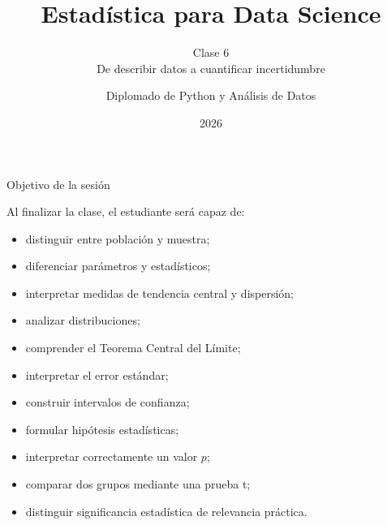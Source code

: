 \documentclass[aspectratio=169,11pt]{beamer}
\title{Estadística para Data Science}
\subtitle{
Clase 6\\
De describir datos a cuantificar incertidumbre
}
\author{
Diplomado de Python y Análisis de Datos
}
\institute{
Universidad Marista
}
\date{2026}
\begin{document}

\begin{frame}
    \titlepage
\end{frame}


\begin{frame}{Objetivo de la sesión}

Al finalizar la clase, el estudiante será capaz de:

\begin{itemize}

    \item distinguir entre población y muestra;

    \item diferenciar parámetros y estadísticos;

    \item interpretar medidas de tendencia central y dispersión;

    \item analizar distribuciones;

    \item comprender el Teorema Central del Límite;

    \item interpretar el error estándar;

    \item construir intervalos de confianza;

    \item formular hipótesis estadísticas;

    \item interpretar correctamente un valor $p$;

    \item comparar dos grupos mediante una prueba t;

    \item distinguir significancia estadística de relevancia práctica.

\end{itemize}

\end{frame}

\end{document}
